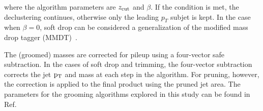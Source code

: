 where the algorithm parameters are $z_{\rm cut}$ and $\beta$.
If the condition is met, the declustering continues, otherwise only the leading $p_{T}$ subjet is kept.
In the case when $\beta=0$, soft drop can be considered a generalization of the modified mass drop tagger (MMDT)~\cite{Dasgupta:2013ihk}. 


The (groomed) masses are corrected for pileup using a four-vector safe subtraction. %
In the cases of soft drop and trimming, the four-vector subtraction corrects the jet $\rm p_{T}$ and mass at each step in the algorithm.
For pruning, however, the correction is applied to the final product using the pruned jet area. 
The parameters for the grooming algorithms explored in this study can be found in Ref.~\cite{JMEPAS} %

                  



